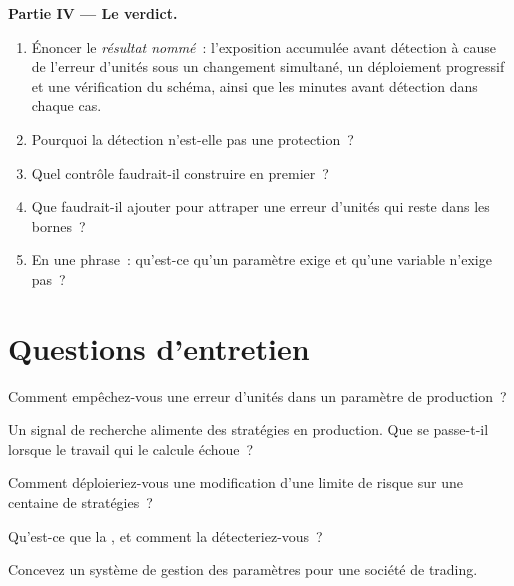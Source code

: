\begin{problem}
\medskip\noindent\textbf{Partie IV --- Le verdict.}
\begin{enumerate}[resume]
\item Énoncer le \emph{résultat nommé}~: l'exposition accumulée avant détection à cause de l'erreur d'unités sous un changement simultané, un déploiement progressif
et une vérification du schéma, ainsi que les minutes avant détection dans chaque cas.
\item Pourquoi la détection n'est-elle pas une protection~?
\item Quel contrôle faudrait-il construire en premier~?
\item Que faudrait-il ajouter pour attraper une erreur d'unités qui reste dans les bornes~?
\item En une phrase~: qu'est-ce qu'un paramètre exige et qu'une variable n'exige pas~?
\end{enumerate}
\end{problem}

\section{Questions d'entretien}

\begin{interviewq}\label{iq:pl:signal-serving-and-parameter-management:1}
Comment empêchez-vous une erreur d'unités dans un paramètre de production~?
\end{interviewq}

\begin{interviewq}\label{iq:pl:signal-serving-and-parameter-management:2}
Un signal de recherche alimente des stratégies en production. Que se passe-t-il lorsque le travail qui le calcule échoue~?
\end{interviewq}

\begin{interviewq}\label{iq:pl:signal-serving-and-parameter-management:3}
Comment déploieriez-vous une modification d'une limite de risque sur une centaine de stratégies~?
\end{interviewq}

\begin{interviewq}\label{iq:pl:signal-serving-and-parameter-management:4}
Qu'est-ce que la , et comment la détecteriez-vous~?
\end{interviewq}

\begin{interviewq}\label{iq:pl:signal-serving-and-parameter-management:5}
Concevez un système de gestion des paramètres pour une société de trading.
\end{interviewq}
